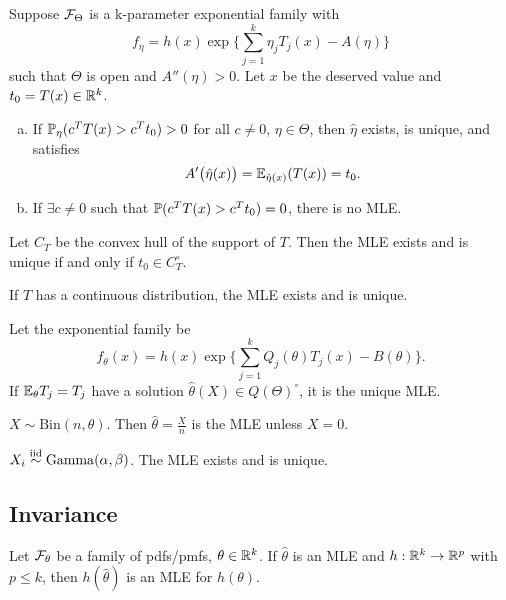 \begin{thm}
	Suppose $\mathcal{F}_\Theta$ is a k-parameter exponential family with 
	$$f_\eta = h(x) \exp \Big \{   \sum_{j=1}^k \eta_j T_j(x) - A(\eta) \Big \}$$
	such that $\Theta$ is open and $A''(\eta) > 0$. Let $x$ be the deserved value and $t_0 = T(x) \in \mathbb{R}^k$.
	\begin{enumerate}[a)]
		\item If $\mathbb{P}_\eta (c^T T(x) > c^T t_0) > 0$ for all $c \neq 0$, $\eta \in \Theta$, then $\hat{\eta}$ exists, is unique, and satisfies
		$$A' \big(\hat{\eta} (x) \big) = \mathbb{E}_{\hat{\eta}(x)} ( T(x) ) = t_0.$$ 
		\item If $\exists c\neq 0$ such that $\mathbb{P}(c^T T(x) > c^T t_0) = 0$, there is no MLE. 
	\end{enumerate}
\end{thm}

\begin{cor}
	Let $C_T$ be the convex hull of the support of $T$. Then the MLE exists and is unique if and only if $t_0 \in C_T^\circ$.
\end{cor}

\begin{cor}
	If $T$ has a continuous distribution, the MLE exists and is unique.
\end{cor}

\begin{cor}
	Let the exponential family be 
	$$f_\theta(x) = h(x) \exp \Big\{  \sum_{j=1}^k Q_j(\theta) T_j(x) - B(\theta)  \Big\}.$$
	If $\mathbb{E}_\theta T_j = T_j$ have a solution $\hat{\theta}(X) \in Q(\Theta)^\circ$, it is the unique MLE.
\end{cor}

\begin{exap}
	$X\sim \mathrm{Bin}(n, \theta)$. Then $\hat{\theta} = \frac{X}{n}$ is the MLE unless $X=0$.
\end{exap}

\begin{exap}
	$X_i \stackrel{\text{iid}}{\sim} \mathrm{Gamma}(\alpha, \beta)$. The MLE exists and is unique.
\end{exap}

\subsection{Invariance}
{\color{blue}
\begin{thm}
	Let $\mathcal{F}_\theta$ be a family of pdfs/pmfs, $\theta \in \mathbb{R}^k$. 
	If $\hat{\theta}$ is an MLE and $h:\mathbb{R}^k \to \mathbb{R}^p$ with $p\leq k$, then $h(\hat{\theta})$ is an MLE for $h(\theta)$.
\end{thm}} 

